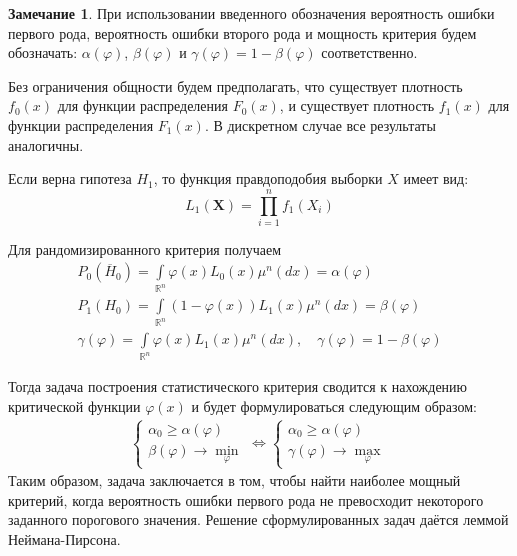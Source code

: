 \documentclass[oneside,final,14pt]{extreport}
\theoremstyle{plain}
\theoremstyle{definition}
\newtheorem*{rmrk}{Замечание}
\theoremstyle{named}
\begin{document}
\begin{rmrk}
При использовании введенного обозначения вероятность ошибки первого рода, вероятность ошибки второго рода и мощность критерия будем обозначать: $\alpha(\varphi)$, $\beta(\varphi)$ и $\gamma(\varphi)=1-\beta(\varphi)$ соответственно.
\end{rmrk}

Без ограничения общности будем предполагать, что существует плотность $f_{0}(x)$ для функции распределения $F_{0}(x)$, и существует плотность $f_{1}(x)$ для функции распределения $F_{1}(x)$. В дискретном случае все результаты аналогичны.

Если верна гипотеза $H_1$, то функция правдоподобия выборки $X$ имеет вид:
\begin{equation*}
    L_{1}\left(\mathbf{X}\right)=\prod_{i=1}^{n} f_{1}\left(X_{i}\right)
\end{equation*}

Для рандомизированного критерия получаем
\begin{gather*}
    P_{0}\left(\overline{H}_{0}\right)=\int\limits_{\mathbb{R}^{n}} \varphi(x) L_{0}(x) \mu^{n}(d x)=\alpha(\varphi) \\
    P_{1}\left(H_{0}\right)=\int\limits_{\mathbb{R}^{n}}(1-\varphi(x)) L_{1}(x) \mu^{n}(d x)=\beta(\varphi) \\
    \gamma(\varphi)=\int\limits_{\mathbb{R}^{n}} \varphi(x) L_{1}(x) \mu^{n}(d x), \quad \gamma(\varphi)=1-\beta(\varphi)
\end{gather*}

Тогда задача построения статистического критерия сводится к нахождению критической функции $\varphi(x)$ и будет формулироваться следующим образом:
\begin{equation*}
    \begin{array}{l}
    \left\{\begin{array}{l}
    \alpha_{0} \geqslant \alpha(\varphi) \\
    \beta(\varphi) \rightarrow \min\limits_{\varphi}
    \end{array}\right.
    \Leftrightarrow
    \left\{\begin{array}{l}
    \alpha_{0} \geqslant \alpha(\varphi) \\
    \gamma(\varphi) \rightarrow \max\limits_{\varphi}
    \end{array}\right.
    \end{array}
\end{equation*}
Таким образом, задача заключается в том, чтобы найти наиболее мощный критерий, когда вероятность ошибки первого рода не превосходит некоторого заданного порогового значения. Решение сформулированных задач даётся леммой Неймана-Пирсона.
\end{document}
